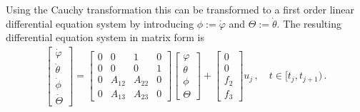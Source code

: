 \noindent
Using the Cauchy transformation this can be transformed to a first order linear differential equation system by introducing $\phi:= \dot \varphi$ and $\Theta := \dot \theta$. The resulting differential equation system in matrix form is
\begin{align}
	\begin{bmatrix}
		\dot \varphi 	\\
		\dot \theta		\\
		\dot \phi		\\
		\dot \Theta
	\end{bmatrix}
	= 
	\begin{bmatrix}
		0 & 0 & 1 & 0 \\
		0 & 0 & 0 & 1 \\
		0 & A_{12} & A_{22} & 0 \\
		0 & A_{13} & A_{23} & 0 
	\end{bmatrix}
	\begin{bmatrix}
		\varphi 	\\
		\theta		\\
		\phi		\\
		\Theta
	\end{bmatrix} + 
	\begin{bmatrix}
		0\\
		0\\
		f_2\\
		f_3
	\end{bmatrix}u_j\,,\quad t\in[t_{j},t_{j+1})\,.
\end{align}

